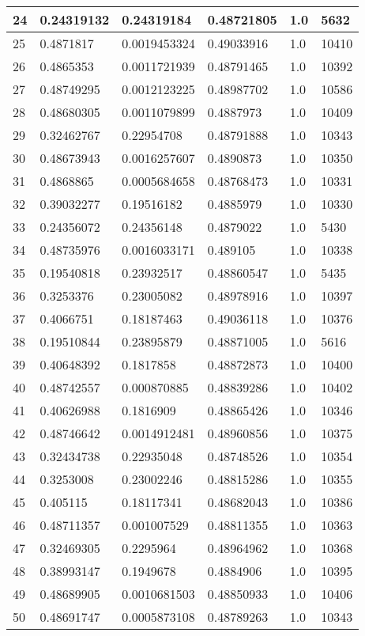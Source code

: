 \begin{longtable}{|l|l|l|l|l|l|}
24 & 0.24319132 & 0.24319184 & 0.48721805 & 1.0 & 5632 \\ \hline 
25 & 0.4871817 & 0.0019453324 & 0.49033916 & 1.0 & 10410 \\ \hline 
26 & 0.4865353 & 0.0011721939 & 0.48791465 & 1.0 & 10392 \\ \hline 
27 & 0.48749295 & 0.0012123225 & 0.48987702 & 1.0 & 10586 \\ \hline 
28 & 0.48680305 & 0.0011079899 & 0.4887973 & 1.0 & 10409 \\ \hline 
29 & 0.32462767 & 0.22954708 & 0.48791888 & 1.0 & 10343 \\ \hline 
30 & 0.48673943 & 0.0016257607 & 0.4890873 & 1.0 & 10350 \\ \hline 
31 & 0.4868865 & 0.0005684658 & 0.48768473 & 1.0 & 10331 \\ \hline 
32 & 0.39032277 & 0.19516182 & 0.4885979 & 1.0 & 10330 \\ \hline 
33 & 0.24356072 & 0.24356148 & 0.4879022 & 1.0 & 5430 \\ \hline 
34 & 0.48735976 & 0.0016033171 & 0.489105 & 1.0 & 10338 \\ \hline 
35 & 0.19540818 & 0.23932517 & 0.48860547 & 1.0 & 5435 \\ \hline 
36 & 0.3253376 & 0.23005082 & 0.48978916 & 1.0 & 10397 \\ \hline 
37 & 0.4066751 & 0.18187463 & 0.49036118 & 1.0 & 10376 \\ \hline 
38 & 0.19510844 & 0.23895879 & 0.48871005 & 1.0 & 5616 \\ \hline 
39 & 0.40648392 & 0.1817858 & 0.48872873 & 1.0 & 10400 \\ \hline 
40 & 0.48742557 & 0.000870885 & 0.48839286 & 1.0 & 10402 \\ \hline 
41 & 0.40626988 & 0.1816909 & 0.48865426 & 1.0 & 10346 \\ \hline 
42 & 0.48746642 & 0.0014912481 & 0.48960856 & 1.0 & 10375 \\ \hline 
43 & 0.32434738 & 0.22935048 & 0.48748526 & 1.0 & 10354 \\ \hline 
44 & 0.3253008 & 0.23002246 & 0.48815286 & 1.0 & 10355 \\ \hline 
45 & 0.405115 & 0.18117341 & 0.48682043 & 1.0 & 10386 \\ \hline 
46 & 0.48711357 & 0.001007529 & 0.48811355 & 1.0 & 10363 \\ \hline 
47 & 0.32469305 & 0.2295964 & 0.48964962 & 1.0 & 10368 \\ \hline 
48 & 0.38993147 & 0.1949678 & 0.4884906 & 1.0 & 10395 \\ \hline 
49 & 0.48689905 & 0.0010681503 & 0.48850933 & 1.0 & 10406 \\ \hline 
50 & 0.48691747 & 0.0005873108 & 0.48789263 & 1.0 & 10343 \\ \hline 
\end{longtable}
